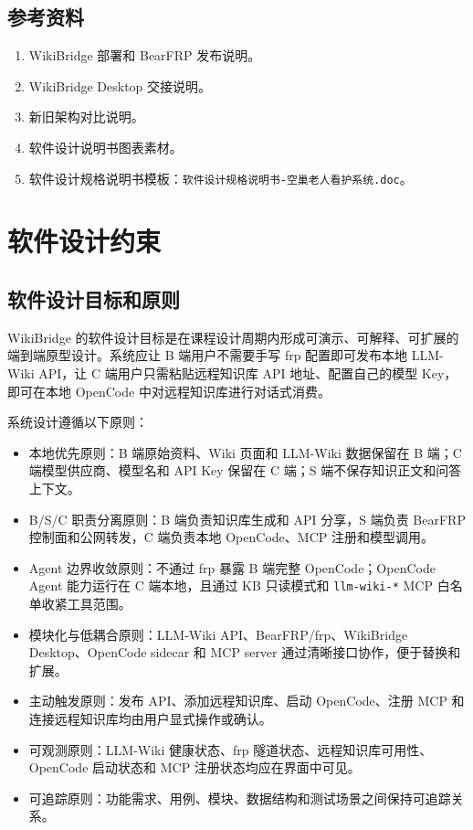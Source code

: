\documentclass[UTF8,a4paper,12pt,fontset=fandol]{ctexart}
\newcommand{\code}[1]{\texttt{\footnotesize #1}}
\begin{document}
\subsection{参考资料}
\begin{enumerate}
  \item WikiBridge 部署和 BearFRP 发布说明。
  \item WikiBridge Desktop 交接说明。
  \item 新旧架构对比说明。
  \item 软件设计说明书图表素材。
  \item 软件设计规格说明书模板：\code{软件设计规格说明书-空巢老人看护系统.doc}。
\end{enumerate}

\section{软件设计约束}

\subsection{软件设计目标和原则}
WikiBridge 的软件设计目标是在课程设计周期内形成可演示、可解释、可扩展的端到端原型设计。系统应让 B 端用户不需要手写 frp 配置即可发布本地 LLM-Wiki API，让 C 端用户只需粘贴远程知识库 API 地址、配置自己的模型 Key，即可在本地 OpenCode 中对远程知识库进行对话式消费。

系统设计遵循以下原则：
\begin{itemize}
  \item 本地优先原则：B 端原始资料、Wiki 页面和 LLM-Wiki 数据保留在 B 端；C 端模型供应商、模型名和 API Key 保留在 C 端；S 端不保存知识正文和问答上下文。
  \item B/S/C 职责分离原则：B 端负责知识库生成和 API 分享，S 端负责 BearFRP 控制面和公网转发，C 端负责本地 OpenCode、MCP 注册和模型调用。
  \item Agent 边界收敛原则：不通过 frp 暴露 B 端完整 OpenCode；OpenCode Agent 能力运行在 C 端本地，且通过 KB 只读模式和 \code{llm-wiki-*} MCP 白名单收紧工具范围。
  \item 模块化与低耦合原则：LLM-Wiki API、BearFRP/frp、WikiBridge Desktop、OpenCode sidecar 和 MCP server 通过清晰接口协作，便于替换和扩展。
  \item 主动触发原则：发布 API、添加远程知识库、启动 OpenCode、注册 MCP 和连接远程知识库均由用户显式操作或确认。
  \item 可观测原则：LLM-Wiki 健康状态、frp 隧道状态、远程知识库可用性、OpenCode 启动状态和 MCP 注册状态均应在界面中可见。
  \item 可追踪原则：功能需求、用例、模块、数据结构和测试场景之间保持可追踪关系。
\end{itemize}
\end{document}
